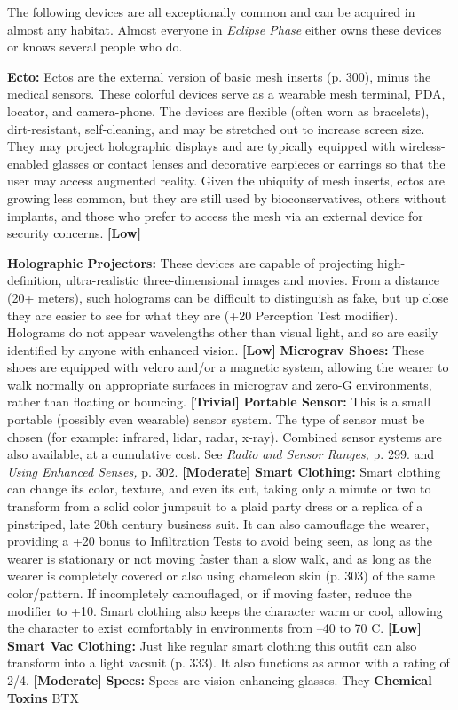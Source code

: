The following devices are all exceptionally common 
and can be acquired in almost any habitat. Almost 
everyone in \textit{Eclipse Phase} either owns these devices or 
knows several people who do.

\textbf{Ecto:} Ectos are the external version of basic mesh 
inserts (p. 300), minus the medical sensors. These colorful
devices serve as a wearable mesh terminal, PDA,
locator, and camera-phone. The devices are flexible 
(often worn as bracelets), dirt-resistant, self-cleaning, 
and may be stretched out to increase screen size. They 
may project holographic displays and are typically 
equipped with wireless-enabled glasses or contact 
lenses and decorative earpieces or earrings so that the 
user may access augmented reality. Given the ubiquity 
of mesh inserts, ectos are growing less common, but 
they are still used by bioconservatives, others without 
implants, and those who prefer to access the mesh via 
an external device for security concerns. \textbf{[Low]}

\textbf{Holographic Projectors: }These devices are capable 
of projecting high-definition, ultra-realistic three-dimensional
images and movies. From a distance (20+
meters), such holograms can be difficult to distinguish 
as fake, but up close they are easier to see for what they 
are (+20 Perception Test modifier). Holograms do not 
appear wavelengths other than visual light, and so are 
easily identified by anyone with enhanced vision. \textbf{[Low]}
\textbf{Micrograv Shoes:} These shoes are equipped with 
velcro and/or a magnetic system, allowing the wearer 
to walk normally on appropriate surfaces in micrograv
and zero-G environments, rather than floating or
bouncing. \textbf{[Trivial]}
\textbf{Portable Sensor:} This is a small portable (possibly 
even wearable) sensor system. The type of sensor must 
be chosen (for example: infrared, lidar, radar, x-ray). 
Combined sensor systems are also available, at a cumulative
cost. See \textit{Radio and Sensor Ranges,} p. 299.
and \textit{Using Enhanced Senses,} p. 302. \textbf{[Moderate]}
\textbf{Smart Clothing: }Smart clothing can change its 
color, texture, and even its cut, taking only a minute 
or two to transform from a solid color jumpsuit to a 
plaid party dress or a replica of a pinstriped, late 20th 
century business suit. It can also camouflage the wearer, 
providing a +20 bonus to Infiltration Tests to avoid 
being seen, as long as the wearer is stationary or not 
moving faster than a slow walk, and as long as the 
wearer is completely covered or also using chameleon 
skin (p. 303) of the same color/pattern. If incompletely 
camouflaged, or if moving faster, reduce the modifier 
to +10. Smart clothing also keeps the character warm 
or cool, allowing the character to exist comfortably in 
environments from –40 to 70 C. \textbf{[Low]}
\textbf{Smart Vac Clothing:} Just like regular smart clothing
this outfit can also transform into a light vacsuit
(p. 333). It also functions as armor with a rating of 
2/4. \textbf{[Moderate]}
\textbf{Specs:  }Specs are vision-enhancing glasses. They 
\textbf{Chemical Toxins}
BTX

